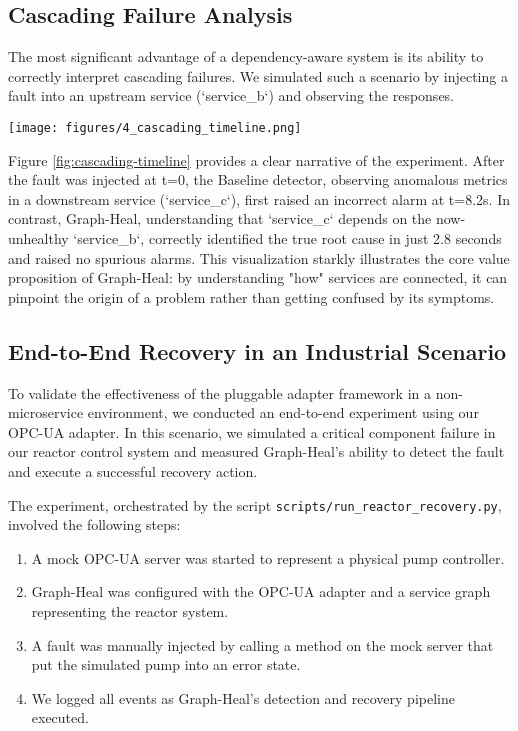 \documentclass[11pt,conference]{IEEEtran}
\begin{document}
\subsection{Cascading Failure Analysis}
The most significant advantage of a dependency-aware system is its ability to correctly interpret cascading failures. We simulated such a scenario by injecting a fault into an upstream service (`service\_b`) and observing the responses.

\begin{figure*}[ht]
  \centering
  \texttt{[image: figures/4\_cascading\_timeline.png]}
  \caption{Timeline of events during the cascading failure scenario. The Baseline detector incorrectly flags a downstream service before the root cause, while Graph-Heal immediately and correctly identifies the source of the fault.}
  \label{fig:cascading-timeline}
\end{figure*}

Figure \ref{fig:cascading-timeline} provides a clear narrative of the experiment. After the fault was injected at t=0, the Baseline detector, observing anomalous metrics in a downstream service (`service\_c`), first raised an incorrect alarm at t=8.2s. In contrast, Graph-Heal, understanding that `service\_c` depends on the now-unhealthy `service\_b`, correctly identified the true root cause in just 2.8 seconds and raised no spurious alarms. This visualization starkly illustrates the core value proposition of Graph-Heal: by understanding "how" services are connected, it can pinpoint the origin of a problem rather than getting confused by its symptoms.

\subsection{End-to-End Recovery in an Industrial Scenario}
To validate the effectiveness of the pluggable adapter framework in a non-microservice environment, we conducted an end-to-end experiment using our OPC-UA adapter. In this scenario, we simulated a critical component failure in our reactor control system and measured Graph-Heal's ability to detect the fault and execute a successful recovery action.

The experiment, orchestrated by the script \texttt{scripts/run\_reactor\_recovery.py}, involved the following steps:
\begin{enumerate}
    \item A mock OPC-UA server was started to represent a physical pump controller.
    \item Graph-Heal was configured with the OPC-UA adapter and a service graph representing the reactor system.
    \item A fault was manually injected by calling a method on the mock server that put the simulated pump into an error state.
    \item We logged all events as Graph-Heal's detection and recovery pipeline executed.
\end{enumerate}
\end{document}
